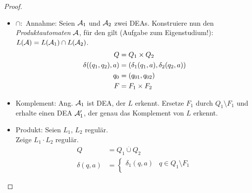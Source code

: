 {\begin{proof}
\begin{itemize}
\begin{figure}[tp]
            \caption{\acs{NEA} f"ur Vereinigung}
            \label{fig:reg-closure-union}
        \end{figure}
        \item $\cap:$ 
        Annahme: Seien $\mathcal{A}_1$ und $\mathcal{A}_2$ zwei DEAs. Konstruiere nun  den \emph{Produktautomaten} $\mathcal{A}$, für den gilt (Aufgabe zum Eigenstudium!): $L(\mathcal{A}) = L(\mathcal{A}_1) \cap L(\mathcal{A}_2)$.
		\begin{align*}
			Q &= Q_1\times Q_2\\
			\delta((q_1,q_2),a) &= (\delta_1(q_1,a),\delta_2(q_2,a))\\
			q_0 &= (q_{01},q_{02})\\
			F &= F_1\times F_2\\
		\end{align*}
	\item Komplement: Ang. $\mathcal{A}_1$ ist \ac{DEA}, der $L$ erkennt. Ersetze $F_1$ durch $Q_1\setminus F_1$ und erhalte einen DEA $\mathcal{A}_1'$, der genau das Komplement von $L$ erkennt. 
%
%
        \item Produkt: Seien $L_1$, $L_2$ regulär.\\
                Zeige $L_1\cdot L_2$ regulär.
                \begin{align*}
                        Q &= Q_1 \overset.\cup Q_2\\
                        \delta(q,a) &=
                                \begin{cases}
                                        \delta_1(q,a) & q\in Q_1\setminus F_1\\

\end{cases}
\end{align*}
\end{itemize}
\end{proof}}

